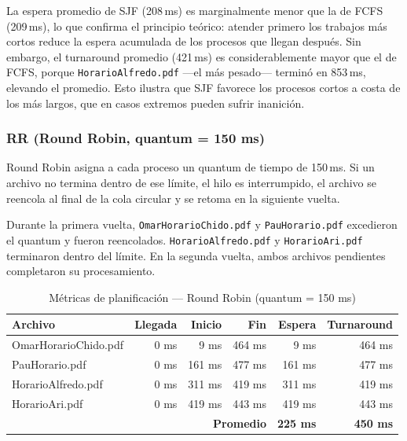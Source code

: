La espera promedio de SJF (208\,ms) es marginalmente menor que la de FCFS (209\,ms),
lo que confirma el principio teórico: atender primero los trabajos más cortos reduce
la espera acumulada de los procesos que llegan después. Sin embargo, el turnaround
promedio (421\,ms) es considerablemente mayor que el de FCFS, porque
\texttt{HorarioAlfredo.pdf} —el más pesado— terminó en 853\,ms, elevando el promedio.
Esto ilustra que SJF favorece los procesos cortos a costa de los más largos,
que en casos extremos pueden sufrir inanición.

\subsubsection{RR (Round Robin, quantum = 150 ms)}

Round Robin asigna a cada proceso un quantum de tiempo de 150\,ms. Si un archivo
no termina dentro de ese límite, el hilo es interrumpido, el archivo se reencola
al final de la cola circular y se retoma en la siguiente vuelta.

Durante la primera vuelta, \texttt{OmarHorarioChido.pdf} y \texttt{PauHorario.pdf}
excedieron el quantum y fueron reencolados. \texttt{HorarioAlfredo.pdf} y
\texttt{HorarioAri.pdf} terminaron dentro del límite. En la segunda vuelta,
ambos archivos pendientes completaron su procesamiento.

\begin{table}[H]
\centering
\caption{Métricas de planificación — Round Robin (quantum = 150 ms)}
\label{tab:rr-metricas}
\begin{tabular}{|l|r|r|r|r|r|}
\hline
\textbf{Archivo} & \textbf{Llegada} & \textbf{Inicio} & \textbf{Fin} & \textbf{Espera} & \textbf{Turnaround} \\
\hline
OmarHorarioChido.pdf &   0 ms &   9 ms & 464 ms &   9 ms & 464 ms \\
PauHorario.pdf       &   0 ms & 161 ms & 477 ms & 161 ms & 477 ms \\
HorarioAlfredo.pdf   &   0 ms & 311 ms & 419 ms & 311 ms & 419 ms \\
HorarioAri.pdf       &   0 ms & 419 ms & 443 ms & 419 ms & 443 ms \\
\hline
\multicolumn{4}{|r|}{\textbf{Promedio}} & \textbf{225 ms} & \textbf{450 ms} \\
\hline
\end{tabular}
\end{table}

